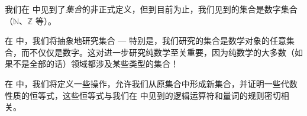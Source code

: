 我们在  中见到了\textit{集合}的非正式定义，但到目前为止，我们见到的集合是数字集合（$\mathbb{N}$、$\mathbb{Z}$ 等）。

在  中，我们将抽象地研究集合 --- 特别是，我们研究的集合是数学对象的任意集合，而不仅仅是数字。这对进一步研究纯数学至关重要，因为纯数学的大多数（如果不是全部的话）领域都涉及某些类型的集合！

在  中，我们将定义一些操作，允许我们从原集合中形成新集合，并证明一些代数性质的恒等式，这些恒等式与我们在  中见到的逻辑运算符和量词的规则密切相关。